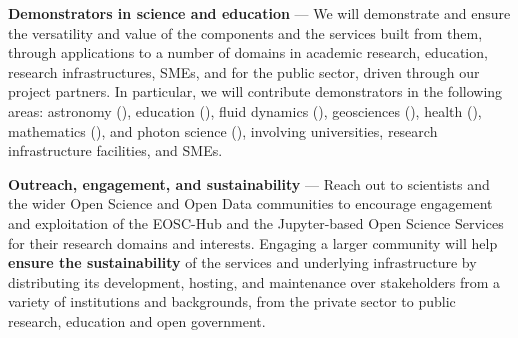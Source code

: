 \begin{compactenum}
\item \label{obj:demonstrators}
  \textbf{Demonstrators in science and education} ---
  We will demonstrate and ensure the versatility and value of the components and
  the services built from them,
  through applications to a number of
  domains in academic research, education, research infrastructures, SMEs, and for
  the public sector, driven through our project partners. In
  particular, we will contribute demonstrators in the following areas:
  astronomy (), education
  (), fluid dynamics
  (), geosciences
  (), health
  (), mathematics
  (),
  and photon science (),
  involving universities, research infrastructure facilities, and SMEs.

\item \label{obj:outreach-and-engagement}
  \textbf{Outreach, engagement, and sustainability} ---
  Reach out to scientists and the wider Open Science and Open Data
  communities to encourage engagement
  and exploitation of the EOSC-Hub and the Jupyter-based Open Science
  Services for their research domains and interests.
  Engaging a larger community will help \textbf{ensure the sustainability} of
  the services and underlying infrastructure by distributing its
  development, hosting, and maintenance over stakeholders from a
  variety of institutions and backgrounds,
  from the private sector to public research, education
  and open government.

\end{compactenum}

